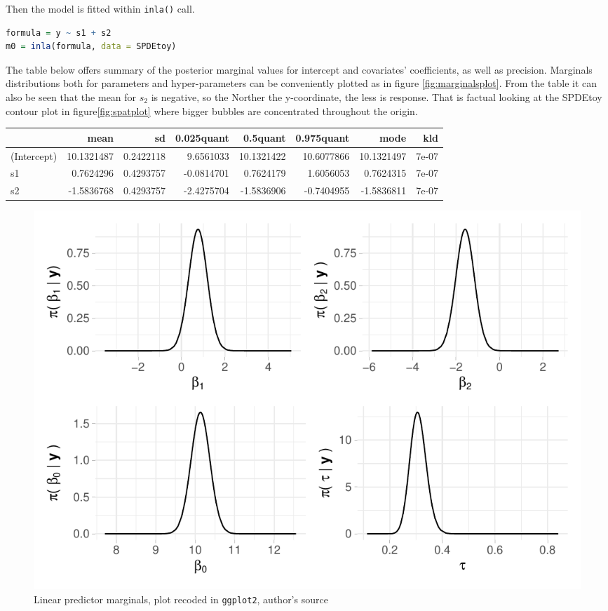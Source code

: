 \documentclass[
  12pt,
  a4paper,
  oneside]{book}
\newcommand{\passthrough}[1]{#1}
\theoremstyle{definition}
\theoremstyle{definition}
\theoremstyle{definition}
\theoremstyle{remark}
\begin{document}
Then the model is fitted within \passthrough{\lstinline!inla()!} call.

\begin{lstlisting}[language=R]
formula = y ~ s1 + s2
m0 = inla(formula, data = SPDEtoy)
\end{lstlisting}

The table below offers summary of the posterior marginal values for intercept and covariates' coefficients, as well as precision. Marginals distributions both for parameters and hyper-parameters can be conveniently plotted as in figure \ref{fig:marginalsplot}. From the table it can also be seen that the mean for \(s_2\) is negative, so the Norther the y-coordinate, the less is response. That is factual looking at the SPDEtoy contour plot in figure\ref{fig:spatplot} where bigger bubbles are concentrated throughout the origin.

\begin{tabular}{lrrrrrrr}
\toprule
  & mean & sd & 0.025quant & 0.5quant & 0.975quant & mode & kld\\
\midrule
(Intercept) & 10.1321487 & 0.2422118 & 9.6561033 & 10.1321422 & 10.6077866 & 10.1321497 & 7e-07\\
s1 & 0.7624296 & 0.4293757 & -0.0814701 & 0.7624179 & 1.6056053 & 0.7624315 & 7e-07\\
s2 & -1.5836768 & 0.4293757 & -2.4275704 & -1.5836906 & -0.7404955 & -1.5836811 & 7e-07\\
\bottomrule
\end{tabular}

\begin{figure}
\centering
\includegraphics{04-inla_files/figure-latex/postplot-1.pdf}
\caption{\label{fig:postplot}Linear predictor marginals, plot recoded in \passthrough{\lstinline!ggplot2!}, author's source}
\end{figure}
\end{document}
